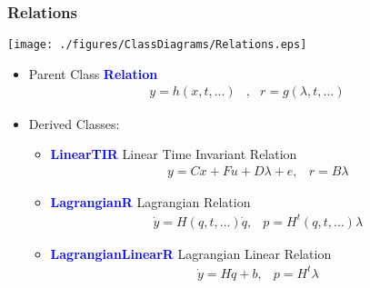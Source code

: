 \frame
{
\frametitle{Relations}
 \begin{center}\texttt{[image: ./figures/ClassDiagrams/Relations.eps]}\end{center}
 \begin{itemize}
 \item Parent Class \textcolor{blue}{\textbf{Relation}} 
   \begin{equation*}\begin{array}{lcc}
       y = h(x,t,...) &,& r = g(\lambda,t,...) 
     \end{array}\end{equation*}
   \pause
 \item Derived Classes:
   \begin{itemize}
   \item \textcolor{blue}{\textbf{LinearTIR}} Linear Time Invariant Relation
     \begin{eqnarray*}\label{LinearTIR}
       y = Cx + Fu +D\lambda +e, & r = B\lambda 
     \end{eqnarray*}
   \item \textcolor{blue}{\textbf{LagrangianR}} Lagrangian Relation
     \begin{eqnarray*}\label{LagrangianR}
       \dot y = H(q,t,\ldots) \dot q, &p= H^t(q,t,\ldots) \lambda 
     \end{eqnarray*}
   \item \textcolor{blue}{\textbf{LagrangianLinearR}} Lagrangian Linear Relation
     \begin{eqnarray*}
       \dot y=H \dot q + b, & p= H^t \lambda 
     \end{eqnarray*}
   \end{itemize}
 \end{itemize}
}
\frame
